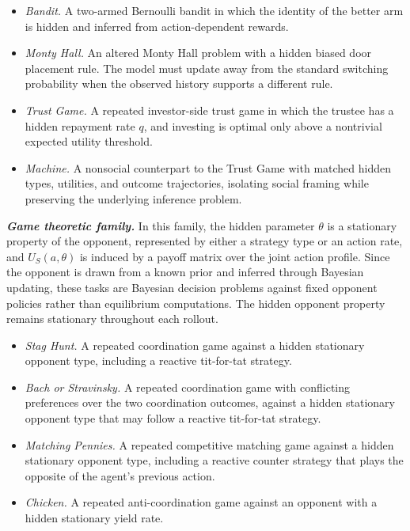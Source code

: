 \documentclass[letterpaper]{article} %
\begin{document}
\begin{itemize}
    \item \textit{Bandit.}
    A two-armed Bernoulli bandit in which the identity of the better arm is
    hidden and inferred from action-dependent rewards.

    \item \textit{Monty Hall.}
    An altered Monty Hall problem with a hidden biased door placement rule.
    The model must update away from the standard switching probability when
    the observed history supports a different rule.

    \item \textit{Trust Game.}
    A repeated investor-side trust game in which the trustee has a hidden
    repayment rate \(q\), and investing is optimal only above a nontrivial
    expected utility threshold.

    \item \textit{Machine.}
    A nonsocial counterpart to the Trust Game with matched hidden types,
    utilities, and outcome trajectories, isolating social framing while
    preserving the underlying inference problem.
\end{itemize}

\textbf{\textit{Game theoretic family.}}
In this family, the hidden parameter \(\theta\) is a stationary property
of the opponent, represented by either a strategy type or an action rate,
and \(U_S(a,\theta)\) is induced by a payoff matrix over the joint action
profile. Since the opponent is drawn from a known prior and inferred
through Bayesian updating, these tasks are Bayesian decision problems
against fixed opponent policies rather than equilibrium computations.
The hidden opponent property remains stationary throughout each rollout.

\begin{itemize}
    \item \textit{Stag Hunt.}
    A repeated coordination game against a hidden stationary opponent type,
    including a reactive tit-for-tat strategy.

    \item \textit{Bach or Stravinsky.}
    A repeated coordination game with conflicting preferences over the two
    coordination outcomes, against a hidden stationary opponent type that
    may follow a reactive tit-for-tat strategy.

    \item \textit{Matching Pennies.}
    A repeated competitive matching game against a hidden stationary
    opponent type, including a reactive counter strategy that plays the
    opposite of the agent's previous action.

    \item \textit{Chicken.}
    A repeated anti-coordination game against an opponent with a hidden
    stationary yield rate.
\end{itemize}
\end{document}
